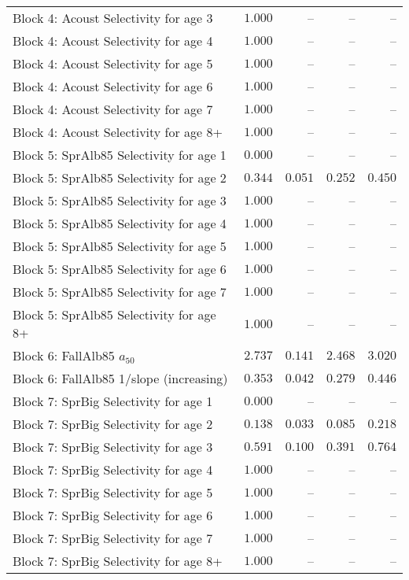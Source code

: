 \documentclass[
]{article}
\begin{document}
\begin{landscape}
\begin{longtable}[t]{lrrrr}
Block 4: Acoust Selectivity for age 3 & $1.000$ & -- & -- & --\\
Block 4: Acoust Selectivity for age 4 & $1.000$ & -- & -- & --\\
Block 4: Acoust Selectivity for age 5 & $1.000$ & -- & -- & --\\
Block 4: Acoust Selectivity for age 6 & $1.000$ & -- & -- & --\\
\addlinespace
Block 4: Acoust Selectivity for age 7 & $1.000$ & -- & -- & --\\
Block 4: Acoust Selectivity for age 8+ & $1.000$ & -- & -- & --\\
Block 5: SprAlb85 Selectivity for age 1 & $0.000$ & -- & -- & --\\
Block 5: SprAlb85 Selectivity for age 2 & $0.344$ & $0.051$ & $0.252$ & $0.450$\\
Block 5: SprAlb85 Selectivity for age 3 & $1.000$ & -- & -- & --\\
\addlinespace
Block 5: SprAlb85 Selectivity for age 4 & $1.000$ & -- & -- & --\\
Block 5: SprAlb85 Selectivity for age 5 & $1.000$ & -- & -- & --\\
Block 5: SprAlb85 Selectivity for age 6 & $1.000$ & -- & -- & --\\
Block 5: SprAlb85 Selectivity for age 7 & $1.000$ & -- & -- & --\\
Block 5: SprAlb85 Selectivity for age 8+ & $1.000$ & -- & -- & --\\
\addlinespace
Block 6: FallAlb85 $a_{50}$ & $2.737$ & $0.141$ & $2.468$ & $3.020$\\
Block 6: FallAlb85 1/slope (increasing) & $0.353$ & $0.042$ & $0.279$ & $0.446$\\
Block 7: SprBig Selectivity for age 1 & $0.000$ & -- & -- & --\\
Block 7: SprBig Selectivity for age 2 & $0.138$ & $0.033$ & $0.085$ & $0.218$\\
Block 7: SprBig Selectivity for age 3 & $0.591$ & $0.100$ & $0.391$ & $0.764$\\
\addlinespace
Block 7: SprBig Selectivity for age 4 & $1.000$ & -- & -- & --\\
Block 7: SprBig Selectivity for age 5 & $1.000$ & -- & -- & --\\
Block 7: SprBig Selectivity for age 6 & $1.000$ & -- & -- & --\\
Block 7: SprBig Selectivity for age 7 & $1.000$ & -- & -- & --\\
Block 7: SprBig Selectivity for age 8+ & $1.000$ & -- & -- & --\\

\end{longtable}
\end{landscape}
\end{document}
